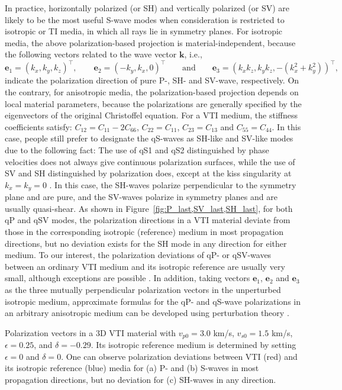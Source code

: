 In practice, horizontally polarized (or SH) and vertically polarized (or SV) are
likely to be the most useful S-wave modes when consideration is restricted to isotropic or TI media,
in which all rays lie in symmetry planes.
For isotropic media, the above polarization-based projection is material-independent,
because the following vectors related to the wave vector $\mathbf{k}$, i.e.,
\begin{equation}
\label{eq:e123}
\mathbf{e}_1=(k_x,k_y,k_z)^{\top},\qquad\mathbf{e}_2=(-k_y,k_x,0)^{\top}\qquad\mbox{and}\qquad\mathbf{e}_3 =(k_xk_z,k_yk_z,-(k^2_x+k^2_y))^{\top},
\end{equation}
indicate the polarization direction of pure P-, SH- and SV-wave, respectively. 
On the contrary, for anisotropic media, the polarization-based projection depends on local material parameters,
because the polarizations are generally specified by the eigenvectors of the original Christoffel equation.
For a VTI medium, the stiffness coefficients satisfy: $C_{12}=C_{11}-2C_{66}$, $C_{22}=C_{11}$, $C_{23}=C_{13}$ and $C_{55}=C_{44}$.
In this case, people still prefer to designate the qS-waves as SH-like and SV-like modes due to the following fact:
The use of qS1 and qS2 distinguished by phase velocities does not always give continuous polarization surfaces,
while the use of SV and SH distinguished by polarization does, except at the kiss singularity at $k_x=k_y=0$
\cite[]{crampin.yedlin:1981,zhang.mcmechan:2010}.
In this case, the SH-waves polarize perpendicular to the symmetry plane and are pure,
and the SV-waves polarize in symmetry planes and are usually quasi-shear.
As shown in Figure~\ref{fig:P_last,SV_last,SH_last}, for both qP and qSV modes, the polarization directions in a VTI material
deviate from those in the corresponding isotropic (reference) medium in most propagation directions,
but no deviation exists for the SH mode in any direction for either medium.
To our interest, the polarization deviations of qP- or qSV-waves between an ordinary VTI
medium and its isotropic reference are usually very small, although exceptions are possible \cite[]{thomsen:1986,tsvankin.chesnokov:1990}.
In addition, taking vectors $\mathbf{e}_1$, $\mathbf{e}_2$ and $\mathbf{e}_3$ as the three mutually perpendicular polarization vectors
in the unperturbed isotropic medium, approximate formulas for the qP- and qS-wave polarizations 
in an arbitrary anisotropic medium can be developed using perturbation theory \cite[]{cerveny.jech:1982,psencik:1998,farra:2001}.

{
Polarization vectors in a 3D VTI material with $v_{p0}=3.0$ km/s,
$v_{s0}=1.5$ km/s, $\epsilon=0.25$, and $\delta=-0.29$. Its isotropic reference
medium is determined by setting $\epsilon=0$ and $\delta=0$.
One can observe polarization deviations between VTI (red) and its isotropic reference (blue) media for (a) P- and (b) S-waves in
most propagation directions, but no deviation for (c) SH-waves in any direction.}

